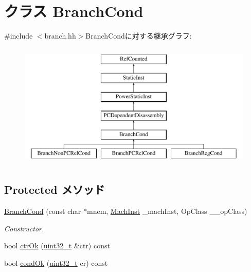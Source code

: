 \hypertarget{classPowerISA_1_1BranchCond}{
\section{クラス BranchCond}
\label{classPowerISA_1_1BranchCond}
}


{\ttfamily \#include $<$branch.hh$>$}BranchCondに対する継承グラフ:\begin{figure}[H]
\begin{center}
\leavevmode
\includegraphics[height=6cm]{classPowerISA_1_1BranchCond}
\end{center}
\end{figure}
\subsection*{Protected メソッド}
\begin{DoxyCompactItemize}
\item 
\hyperlink{classPowerISA_1_1BranchCond_a0e1bdc738c8fef6a9c070d30f0f91849}{BranchCond} (const char $\ast$mnem, \hyperlink{namespacePowerISA_a301c22ea09fa33dcfe6ddf22f203699c}{MachInst} \_\-machInst, OpClass \_\-\_\-opClass)
\begin{DoxyCompactList}\small\item\em Constructor. \item\end{DoxyCompactList}\item 
bool \hyperlink{classPowerISA_1_1BranchCond_a8339b9326dff29ad0ebbab68d0e92bf7}{ctrOk} (\hyperlink{Type_8hh_a435d1572bf3f880d55459d9805097f62}{uint32\_\-t} \&ctr) const 
\item 
bool \hyperlink{classPowerISA_1_1BranchCond_ade38bdf10b82726b48a3ff6b5a3b4b40}{condOk} (\hyperlink{Type_8hh_a435d1572bf3f880d55459d9805097f62}{uint32\_\-t} cr) const 
\end{DoxyCompactItemize}
